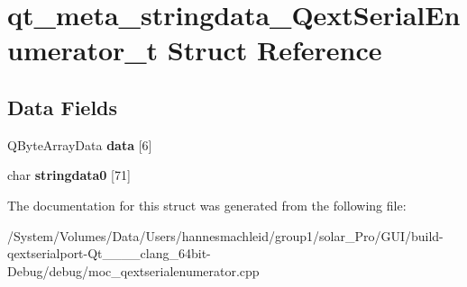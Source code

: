 \hypertarget{structqt__meta__stringdata___qext_serial_enumerator__t}{}\section{qt\+\_\+meta\+\_\+stringdata\+\_\+\+Qext\+Serial\+Enumerator\+\_\+t Struct Reference}
\label{structqt__meta__stringdata___qext_serial_enumerator__t}
\subsection*{Data Fields}
\begin{DoxyCompactItemize}
\item 
\mbox{\label{structqt__meta__stringdata___qext_serial_enumerator__t_a35ace3f26a40c750ee3612eb382bdadb}} 
Q\+Byte\+Array\+Data {\bfseries data} \mbox{[}6\mbox{]}
\item 
\mbox{\label{structqt__meta__stringdata___qext_serial_enumerator__t_a07f92819a137ffbfd9c3c06aa2bf7e69}} 
char {\bfseries stringdata0} \mbox{[}71\mbox{]}
\end{DoxyCompactItemize}


The documentation for this struct was generated from the following file\+:\begin{DoxyCompactItemize}
\item 
/\+System/\+Volumes/\+Data/\+Users/hannesmachleid/group1/solar\+\_\+\+Pro/\+G\+U\+I/build-\/qextserialport-\/\+Qt\+\_\+\_\+\_\+\_\+clang\+\_\+64bit-\/\+Debug/debug/moc\+\_\+qextserialenumerator.\+cpp\end{DoxyCompactItemize}
